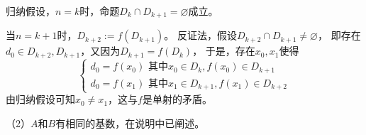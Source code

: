 \documentclass{article}
\begin{document}
归纳假设，$n = k$时，命题$D_{k} \cap D_{k+1} = \varnothing$成立。

当$n = k+1$时，$D_{k+2} := f(D_{k+1})$。
反证法，假设$D_{k+2} \cap D_{k+1} \neq \varnothing$，
即存在$d_0 \in D_{k+2}, D_{k+1}$，又因为$D_{k+1} = f(D_k)$，
于是，存在$x_0, x_1$使得
\begin{equation*}
  \begin{cases*}
    d_0 = f(x_0) \text{ 其中} x_0 \in D_k, f(x_0) \in D_{k+1} \\
    d_0 = f(x_{1}) \text{ 其中}  x_{1} \in D_{k+1}, f(x_1) \in D_{k+2}
  \end{cases*}
\end{equation*}
由归纳假设可知$x_0 \neq x_1$，这与$f$是单射的矛盾。

（2）$A$和$B$有相同的基数，在说明中已阐述。
\end{document}

